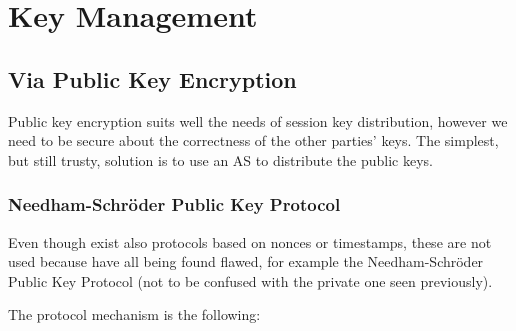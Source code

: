 \documentclass[oneside]{academica}
\begin{document}
\section{Key Management}

\subsection{Via Public Key Encryption}

Public key encryption suits well the needs of session key distribution, however we need to be secure about the correctness of the other parties' keys.
The simplest, but still trusty, solution is to use an AS to distribute the public keys.

\subsubsection{Needham-Schr\"{o}der Public Key Protocol}

Even though exist also protocols based on nonces or timestamps, these are not used because have all being found flawed, for example the Needham-Schr\"{o}der Public Key Protocol (not to be confused with the private one seen previously).

\newpage

The protocol mechanism is the following:
\end{document}
